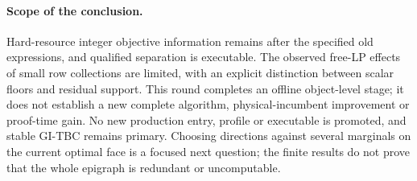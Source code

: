\paragraph{Scope of the conclusion.}
Hard-resource integer objective information remains after the specified old
expressions, and qualified separation is executable. The observed free-LP
effects of small row collections are limited, with an explicit distinction
between scalar floors and residual support. This round completes an offline
object-level stage; it does not establish a new complete algorithm,
physical-incumbent improvement or proof-time gain. No new production entry,
profile or executable is promoted, and stable GI-TBC remains primary.
Choosing directions against several marginals on the current optimal face
is a focused next question; the finite results do not prove that the whole
epigraph is redundant or uncomputable.
